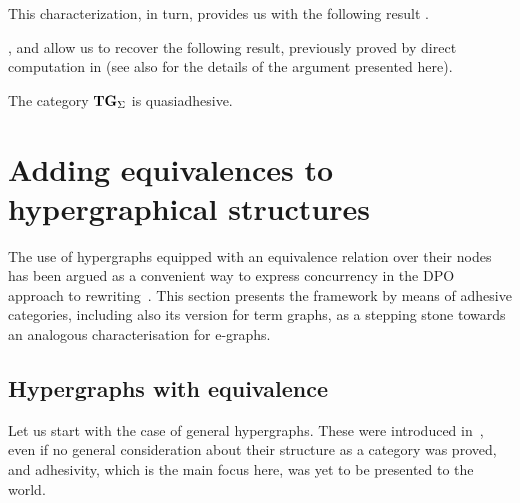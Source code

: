 \documentclass[a4paper,UKenglish,cleveref,pdftex,thm-restate,numberwithinsect]{lipics-v2021}
\newcommand{\catname}[1]{\textbf{\textup{#1}}}
\newcommand{\hyp}{\catname{Hyp}}
\newcommand{\tg}[0]{\catname{TG}_{\Sigma}}
\begin{document}
This characterization, in turn, provides us with the following result \cite{CastelnovoGM24,castelnovo2023thesis}. 



,  and  allow us to recover the following result, previously proved by direct computation in \cite[Thm.~4.2]{CorradiniG05} (see also \cite[Cor.~5.15]{CastelnovoGM24} for the details of the argument presented here).
\begin{corollary}\label{cor:term}
	The category $\tg$ is quasiadhesive.
\end{corollary}

\section{Adding equivalences to hypergraphical structures}
\label{hypereq}
The use of hypergraphs equipped with an equivalence relation over their nodes has been argued as a convenient way to express concurrency in the DPO approach to rewriting~\cite{concur2006}.
This section presents the framework by means of adhesive categories, including also its version for term graphs, as a stepping stone towards an analogous characterisation for e-graphs.

\subsection{Hypergraphs with equivalence}

Let us start with the case of general hypergraphs. These were introduced in~\cite{concur2006}, even if no general consideration about their structure as a category was proved, and adhesivity, 
which is the main focus here, was yet to be presented to the world.
\end{document}
